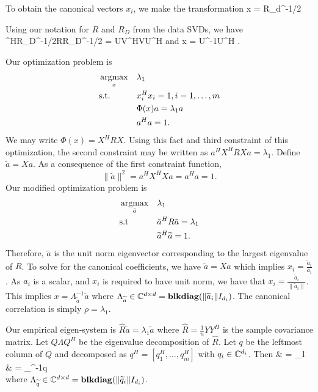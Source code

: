 To obtain the canonical vectors $x_i$, we make the transformation
\be
x = R_d^{-1/2}
\ee

Using our notation for $R$ and $R_D$ from the data SVDs, we have
\be
{}^HR_D^{-1/2}RR_D^{-1/2} = UV^HVU^H
\ee
and
\be
x = U\Sigma^{-1}U^H .
\ee

Our optimization problem is
\begin{equation*}
\begin{aligned}
&\mathop{\rm argmax}_{x}&&\lambda_1\\
&\text{s.t.} && x_i^Hx_i = 1, i=1,\dots,m\\
&&& \Phi(x) a = \lambda_1 a\\
&&& a^Ha=1.\\
\end{aligned}
\end{equation*}
We may write $\Phi(x) = X^HRX$. Using this fact and third constraint of this optimization,
the second constraint may be written as $a^HX^HR Xa=\lambda_1$. Define
$\widetilde{a}=Xa$. As a consequence of the first constraint function,
\begin{equation*}
\|\widetilde{a}\|^2=a^HX^HXa = a^Ha=1.
\end{equation*}
Our modified optimization problem is
\begin{equation*}
\begin{aligned}
&\mathop{\rm argmax}_{\tilde{a}}&&\lambda_1\\
&\text{s.t}&& \tilde{a}^HR\tilde{a} = \lambda_1\\
&&& \widetilde{a}^H\widetilde{a}=1.\\
\end{aligned}
\end{equation*}
Therefore, $\widetilde{a}$ is the unit norm eigenvector corresponding to the largest
eigenvalue of $R$. To solve for the canonical coefficients, we have $\widetilde{a} = Xa$
which implies $x_i=\frac{\widetilde{a}_i}{a_i}$. As $a_i$ is a scalar, and $x_i$ is
required to have unit norm, we have that
$x_i=\frac{\widetilde{a}_i}{\|\widetilde{a}_i\|}$. This implies
$x=\Lambda_{\widetilde{a}}^{-1}\widetilde{a}$ where
$\Lambda_{\widetilde{a}}\in\mathbb{C}^{d\times d}=\mathop{\bf blkdiag}(\|\widetilde{a}_i\|I_{d_i})$. The
canonical correlation is simply $\rho = \lambda_1$.

Our empirical eigen-system is $\widehat{R}\widetilde{a}=\lambda_1\widetilde{a}$ where
$\widehat{R}= \frac{1}{n}YY^H$ is the sample covariance matrix. Let $Q\Lambda Q^H$ be
the eigenvalue decomposition of $\widehat{R}$. Let $q$ be the leftmost column of $Q$ and
decomposed as $q^H=[q_1^H,\dots,q_m^H]$ with $q_i\in\mathbb{C}^{d_i}$. Then
\be\ba
& \widehat{\rho} = \lambda_1\\
& = \Lambda_{}^{-1}q\\
\ea
\ee
where $\Lambda_{\widetilde{q}}\in\mathbb{C}^{d\times d}=\mathop{\bf blkdiag}(\|\widetilde{q}_i\|I_{d_i})$.

